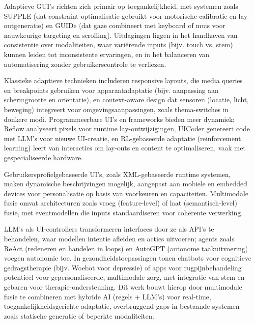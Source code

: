 \documentclass[openany]{book}
\begin{document}
Adaptieve GUI's richten zich primair op toegankelijkheid, met systemen zoals SUPPLE (dat constraint-optimalisatie gebruikt voor motorische calibratie en lay-outgeneratie) en GUIDe (dat gaze combineert met keyboard of muis voor nauwkeurige targeting en scrolling). Uitdagingen liggen in het handhaven van consistentie over modaliteiten, waar variërende inputs (bijv. touch vs. stem) kunnen leiden tot inconsistente ervaringen, en in het balanceren van automatisering zonder gebruikerscontrole te verliezen.

Klassieke adaptieve technieken includeren responsive layouts, die media queries en breakpoints gebruiken voor apparaatadaptatie (bijv. aanpassing aan schermgrootte en oriëntatie), en context-aware design dat sensoren (locatie, licht, beweging) integreert voor omgevingsaanpassingen, zoals thema-switches in donkere modi. Programmeerbare UI's en frameworks bieden meer dynamiek: Reflow analyseert pixels voor runtime lay-outwijzigingen, UICoder genereert code met LLM's voor nieuwe UI-creatie, en RL-gebaseerde adaptatie (reinforcement learning) leert van interacties om lay-outs en content te optimaliseren, vaak met gespecialiseerde hardware.

Gebruikersprofielgebaseerde UI's, zoals XML-gebaseerde runtime systemen, maken dynamische beschrijvingen mogelijk, aangepast aan mobiele en embedded devices voor personalisatie op basis van voorkeuren en capaciteiten. Multimodale fusie omvat architecturen zoals vroeg (feature-level) of laat (semantisch-level) fusie, met eventmodellen die inputs standaardiseren voor coherente verwerking.

LLM's als UI-controllers transformeren interfaces door ze als API's te behandelen, waar modellen intentie afleiden en acties uitvoeren; agents zoals ReAct (redeneren en handelen in loops) en AutoGPT (autonome taakuitvoering) voegen autonomie toe. In gezondheidstoepassingen tonen chatbots voor cognitieve gedragstherapie (bijv. Woebot voor depressie) of apps voor rugpijnbehandeling potentieel voor gepersonaliseerde, multimodale zorg, met integratie van stem en gebaren voor therapie-ondersteuning.
Dit werk bouwt hierop door multimodale fusie te combineren met hybride AI (regels + LLM's) voor real-time, toegankelijkheidsgerichte adaptatie, overbruggend gaps in bestaande systemen zoals statische generatie of beperkte modaliteiten.
\end{document}

